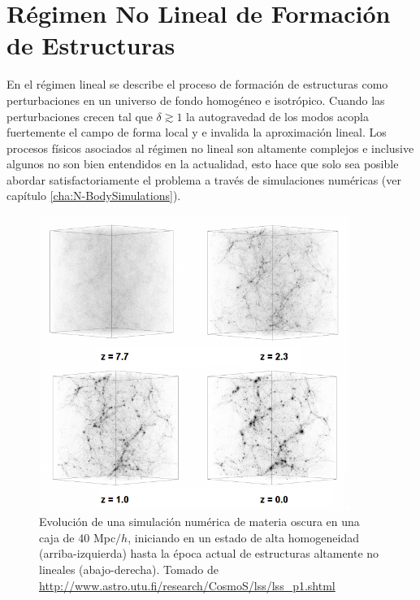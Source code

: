 \section{Régimen No Lineal de Formación de Estructuras}
\label{sec:NonLinearStructureFormation}


En el régimen lineal se describe el proceso de formación de estructuras 
como perturbaciones en un universo de fondo homogéneo e isotrópico. Cuando
las perturbaciones crecen tal que $\delta \gtrsim 1$ la autogravedad de 
los modos acopla fuertemente el campo de forma local y e invalida la 
aproximación lineal. Los procesos físicos asociados al régimen no lineal
son altamente complejos e inclusive algunos no son bien entendidos en la 
actualidad, esto hace que solo sea posible abordar satisfactoriamente el 
problema a través de simulaciones numéricas (ver capítulo 
\ref{cha:N-BodySimulations}).


\begin{figure}[htbp]
	\centering
	\includegraphics[width=0.9\textwidth]
	{./figures/2_theoretical_framework/Nonlinear.png}

	\caption{\small{Evolución de una simulación numérica de materia oscura
	en una caja de 40 Mpc$/h$, iniciando en un estado de alta homogeneidad 
	(arriba-izquierda) hasta la época actual de estructuras altamente no 
	lineales (abajo-derecha). Tomado de 
	\url{http://www.astro.utu.fi/research/CosmoS/lss/lss_p1.shtml}}}
	
	\label{fig:NonLinearUniverse}
\end{figure}


